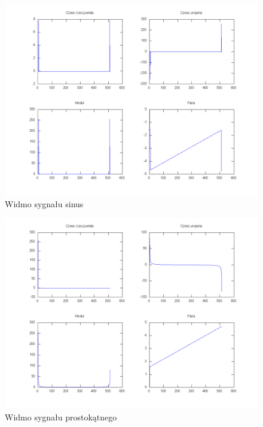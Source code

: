 \documentclass[wide,a4paper,titlepage,12pt]{mwart}
\begin{document}
	\begin{landscape}
	  \begin{figure}[htbp]
	    \begin{center}
	      \includegraphics[scale=.5]{out/fig3.png}
	      \caption{\label{fig3} Widmo sygnału sinus}
	    \end{center}
	  \end{figure}
	\end{landscape}
	
	\begin{landscape}
	  \begin{figure}[htbp]
	    \begin{center}
	      \includegraphics[scale=.5]{out/fig4.png}
	      \caption{\label{fig4} Widmo sygnału prostokątnego}
	    \end{center}
	  \end{figure}
	\end{landscape}
	
\end{document}
